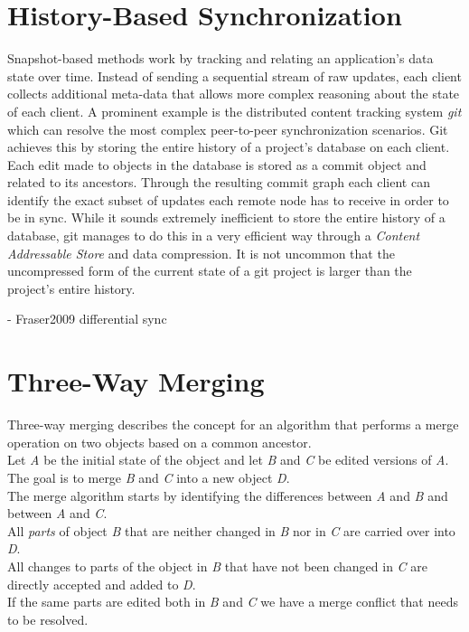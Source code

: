 \section{History-Based Synchronization}
Snapshot-based methods work by tracking and relating an application's data state over time.
Instead of sending a sequential stream of raw updates, each client collects additional meta-data that allows more complex reasoning about the state of each client.
A prominent example is the distributed content tracking system \emph{git} \cite{git} which can resolve the most complex peer-to-peer synchronization scenarios.
Git achieves this by storing the entire history of a project's database on each client.
Each edit made to objects in the database is stored as a commit object and related to its ancestors.
Through the resulting commit graph each client can identify the exact subset of updates each remote node has to receive in order to be in sync.
While it sounds extremely inefficient to store the entire history of a database, git manages to do this in a very efficient way through a \emph{Content Addressable Store} and data compression.
It is not uncommon that the uncompressed form of the current state of a git project is larger than the project's entire history.

- Fraser2009 differential sync

\section{Three-Way Merging}
Three-way merging describes the concept for an algorithm that performs a merge operation on two objects based on a common ancestor.\\
Let \emph{A} be the initial state of the object and let \emph{B} and \emph{C} be edited versions of \emph{A}.
The goal is to merge \emph{B} and \emph{C} into a new object \emph{D}.\\
The merge algorithm starts by identifying the differences between \emph{A} and \emph{B} and between \emph{A} and \emph{C}.\\
All \emph{parts} of object \emph{B} that are neither changed in \emph{B} nor in \emph{C} are carried over into \emph{D}.\\
All changes to parts of the object in \emph{B} that have not been changed in \emph{C} are directly accepted and added to \emph{D}.\\
If the same parts are edited both in \emph{B} and \emph{C} we have a merge conflict that needs to be resolved.\\

